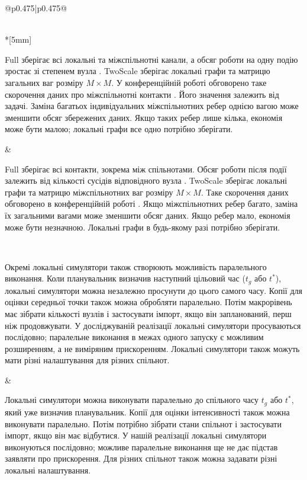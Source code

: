 \documentclass[11pt]{article}
\newcommand{\Full}{\textnormal{Full}}
\newcommand{\TS}{\textnormal{TwoScale}}
\begin{document}
\begin{longtable}{@{}p{0.475\textwidth}|p{0.475\textwidth}@{}}
\begin{minipage}[t]{\linewidth}
\end{minipage} \\*[5mm]
\begin{minipage}[t]{\linewidth}
\Full{} зберігає всі локальні та міжспільнотні канали, а обсяг роботи на одну подію зростає зі степенем вузла \citep{kuryliak2025simulating}. \TS{} зберігає локальні графи та матрицю загальних ваг розміру $M\times M$. У конференційній роботі обговорено таке скорочення даних про міжспільнотні контакти \citep{kuryliak2025towards}. Його значення залежить від задачі. Заміна багатьох індивідуальних міжспільнотних ребер однією вагою може зменшити обсяг збережених даних. Якщо таких ребер лише кілька, економія може бути малою; локальні графи все одно потрібно зберігати.
\end{minipage} &
\begin{minipage}[t]{\linewidth}
\Full{} зберігає всі контакти, зокрема між спільнотами. Обсяг роботи після події залежить від кількості сусідів відповідного вузла \citep{kuryliak2025simulating}. \TS{} зберігає локальні графи та матрицю міжспільнотних ваг розміру $M\times M$. Таке скорочення даних обговорено в конференційній роботі \citep{kuryliak2025towards}. Якщо міжспільнотних ребер багато, заміна їх загальними вагами може зменшити обсяг даних. Якщо ребер мало, економія може бути незначною. Локальні графи в будь-якому разі потрібно зберігати.
\end{minipage} \\[5mm]
\begin{minipage}[t]{\linewidth}
Окремі локальні симулятори також створюють можливість паралельного виконання. Коли планувальник визначив наступний цільовий час ($t_g$ або $t^\ast$), локальні симулятори можна незалежно просунути до цього самого часу. Копії для оцінки середньої точки також можна обробляти паралельно. Потім макрорівень має зібрати кількості вузлів і застосувати імпорт, якщо він запланований, перш ніж продовжувати. У досліджуваній реалізації локальні симулятори просуваються послідовно; паралельне виконання в межах одного запуску є можливим розширенням, а не виміряним прискоренням. Локальні симулятори також можуть мати різні налаштування для різних спільнот.
\end{minipage} &
\begin{minipage}[t]{\linewidth}
Локальні симулятори можна виконувати паралельно до спільного часу $t_g$ або $t^\ast$, який уже визначив планувальник. Копії для оцінки інтенсивності також можна виконувати паралельно. Потім потрібно зібрати стани спільнот і застосувати імпорт, якщо він має відбутися. У нашій реалізації локальні симулятори виконуються послідовно; можливе паралельне виконання ще не дає підстав заявляти про прискорення. Для різних спільнот також можна задавати різні локальні налаштування.

\end{minipage}
\end{longtable}
\end{document}
